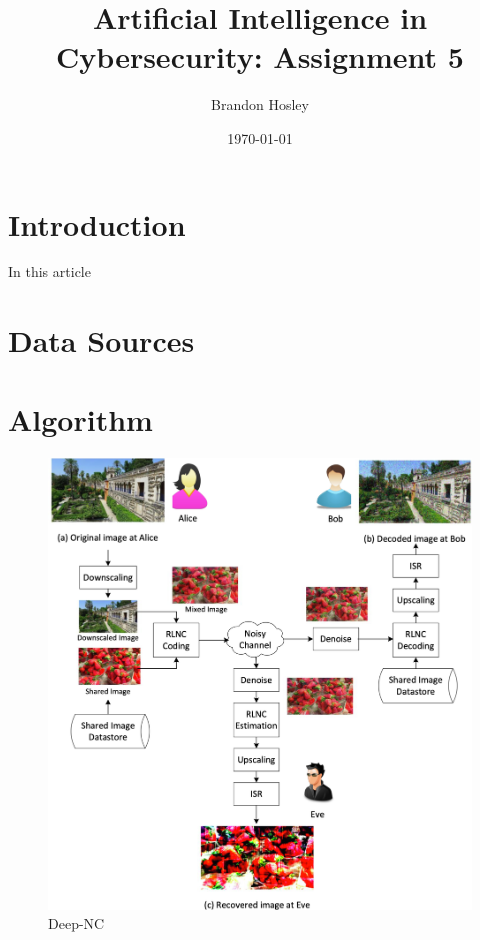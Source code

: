 \documentclass[]{article}
\title{Artificial Intelligence in Cybersecurity: Assignment 5}
\author{Brandon Hosley}
\date{\today}
\begin{document}
	\maketitle
	
\section{Introduction}

In this article \cite{Vien2021} 

\section{Data Sources}


\section{Algorithm}



\begin{figure}[h]
	\centering
	\includegraphics[width=\textwidth]{Algorithm}
	\caption{Deep-NC \cite{Vien2021}}
\end{figure}
\end{document}
